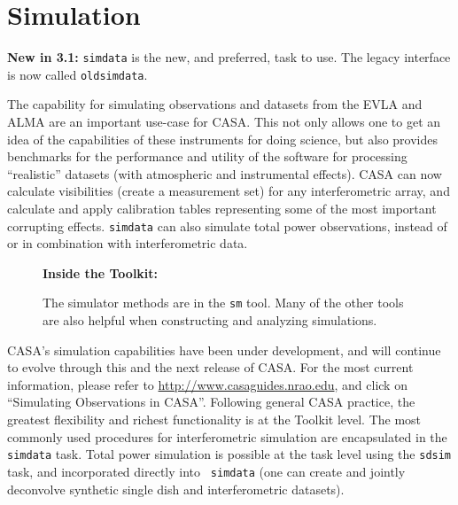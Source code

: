 
\chapter[Simulation]{Simulation}
\label{chapter:sim}

{\bfseries New in 3.1:} {\tt simdata} is the new, and preferred,
task to use.  The legacy interface is now called {\tt oldsimdata}.

The capability for simulating observations and datasets from the EVLA
and ALMA are an important use-case for CASA.  This not only allows one
to get an idea of the capabilities of these instruments for doing
science, but also provides benchmarks for the performance and utility
of the software for processing ``realistic'' datasets (with
atmospheric and instrumental effects).  CASA can now calculate
visibilities (create a measurement set) for any interferometric array,
and calculate and apply calibration tables representing some of the
most important corrupting effects. {\tt simdata} can also simulate total power observations, instead of or in
combination with interferometric data.


\begin{wrapfigure}{r}{2.5in}
 \begin{boxedminipage}{2.5in}
    \centerline{\bf Inside the Toolkit:}
    The simulator methods are in the {\tt sm} tool.
    Many of the other tools are also helpful when
    constructing and analyzing simulations.
 \end{boxedminipage}
\end{wrapfigure}

CASA's simulation capabilities have been under development, and will
continue to evolve through this and the next release of CASA.
For the most current information, please refer to
\url{http://www.casaguides.nrao.edu}, and click on ``Simulating
Observations in CASA''.
%
Following general CASA practice, the greatest flexibility and richest
functionality is at the Toolkit level.  The most commonly used
procedures for interferometric simulation are encapsulated in the {\tt
simdata} task.  Total power simulation is possible at the task level
using the {\tt sdsim} task, and incorporated directly into {\tt
simdata} (one can create and jointly deconvolve synthetic single dish
and interferometric datasets).

